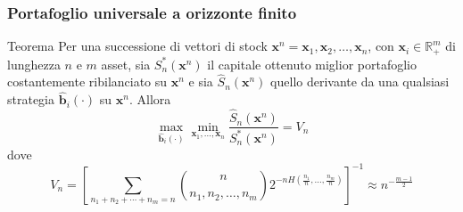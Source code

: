 \documentclass{beamer}
\theoremstyle{plain}
\theoremstyle{definition}
\theoremstyle{remark}
\newcommand{\R}{\mathbb{R}}
\newcommand{\x}{\bm{x}}
\newcommand{\bh}{\hat{\bm{b}}}
\newcommand{\Sh}{\hat{S}}
\begin{document}
\begin{frame}
	\frametitle{Portafoglio universale a orizzonte finito}
	\begin{block}{Teorema}
		Per una successione di vettori di stock $\x^n = \x_1,\x_2,\ldots,\x_n$, con $\x_i\in \R^m_+$ di lunghezza $n$ e $m$ asset, sia $S_n^*(\x^n)$ il capitale ottenuto miglior portafoglio costantemente ribilanciato su $\x^n$ e sia $\Sh_n(\x^n)$ quello derivante da una qualsiasi strategia $\bh_i(\cdot)$ su $\x^n$. Allora
		\begin{equation*}
		\max\limits_{\bh_i(\cdot)}\min\limits_{\x_1,\ldots, \x_{n}}\frac{\Sh_n(\x^n)}{S_n^*(\x^n)}=V_n
		\end{equation*}
		dove
		\begin{equation*}
		V_n=\left[\sum_{n_1+n_2+\cdots+n_m=n}{\binom{n}{n_1,n_2,\ldots,n_m}2^{-nH\left(\frac{n_1}{n},\ldots,\frac{n_m}{n}\right)}}\right]^{-1}\approx n^{-\frac{m-1}{2}}
		\end{equation*}
	\end{block}	
\end{frame}
\end{document}
